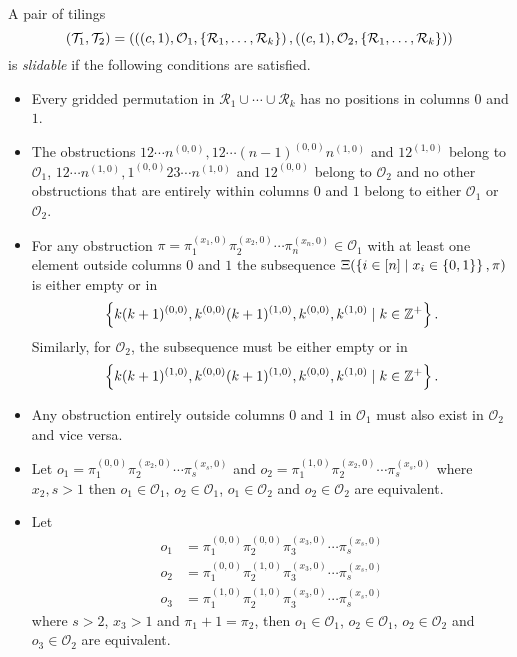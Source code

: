 \begin{definition}\label{def:slidable}
A pair of tilings
\[
    (\mathcal{T}_1,\mathcal{T}_2) = \left(\left((c,1), \mathcal{O}_1, \left\{\mathcal{R}_1,\ldots,\mathcal{R}_k\right\}\right), \left((c,1), \mathcal{O}_2, \left\{\mathcal{R}_1,\ldots,\mathcal{R}_k\right\}\right)\right)
\]
is \emph{slidable} if the following conditions are satisfied.
\begin{itemize}
    \item Every gridded permutation in $\mathcal{R}_1 \cup \cdots \cup \mathcal{R}_k$ has no positions in columns $0$ and $1$.
    \item The obstructions $12\cdots n^{(0,0)}, 12\cdots (n-1)^{(0,0)}n^{(1,0)}$ and $12^{(1,0)}$ belong to $\mathcal{O}_1$, $12\cdots n^{(1,0)}, 1^{(0,0)}23\cdots n^{(1,0)}$ and $12^{(0,0)}$ belong to $\mathcal{O}_2$ and no other obstructions that are entirely within columns $0$ and $1$ belong to either $\mathcal{O}_1$ or $\mathcal{O}_2$.
    \item For any obstruction $\pi = \pi_1^{(x_1,0)}\pi_2^{(x_2,0)}\cdots\pi_n^{(x_n,0)} \in \mathcal{O}_1$ with at least one element outside columns $0$ and $1$ the subsequence $\Xi(\left\{i \in [n] \mid x_i \in \left\{0,1\right\}\right\},\pi)$ is either empty or in 
    \[
         \left\{k(k+1)^{(0,0)}, k^{(0,0)}(k+1)^{(1,0)}, k^{(0,0)},k^{(1,0)} \mid k\in\mathbb{Z}^+\right\}.
    \]
    Similarly, for $\mathcal{O}_2$, the subsequence must be either empty or in 
    \[
         \left\{k(k+1)^{(1,0)}, k^{(0,0)}(k+1)^{(1,0)}, k^{(0,0)},k^{(1,0)} \mid k\in\mathbb{Z}^+\right\}.
    \]
    \item Any obstruction entirely outside columns $0$ and $1$ in $\mathcal{O}_1$ must also exist in $\mathcal{O}_2$ and vice versa.
    \item Let $o_1 = \pi_1^{(0,0)}\pi_2^{(x_2,0)}\cdots\pi_s^{(x_s,0)}$ and $o_2 = \pi_1^{(1,0)}\pi_2^{(x_2,0)}\cdots\pi_s^{(x_s,0)}$ where $x_2,s > 1$ then $o_1 \in \mathcal{O}_1$, $o_2 \in \mathcal{O}_1$, $o_1 \in \mathcal{O}_2$ and $o_2 \in \mathcal{O}_2$ are equivalent.
    \item Let \begin{align*}o_1 &= \pi_1^{(0,0)}\pi_2^{(0,0)}\pi_3^{(x_3,0)}\cdots\pi_s^{(x_s,0)}\\o_2 &= \pi_1^{(0,0)}\pi_2^{(1,0)}\pi_3^{(x_3,0)}\cdots\pi_s^{(x_s,0)}\\o_3 &= \pi_1^{(1,0)}\pi_2^{(1,0)}\pi_3^{(x_3,0)}\cdots\pi_s^{(x_s,0)}\end{align*} where $s > 2$, $x_3 > 1$ and $\pi_1 + 1 = \pi_2$, then $o_1 \in \mathcal{O}_1$, $o_2 \in \mathcal{O}_1$, $o_2 \in \mathcal{O}_2$ and $o_3 \in \mathcal{O}_2$ are equivalent.
\end{itemize}
\end{definition}


